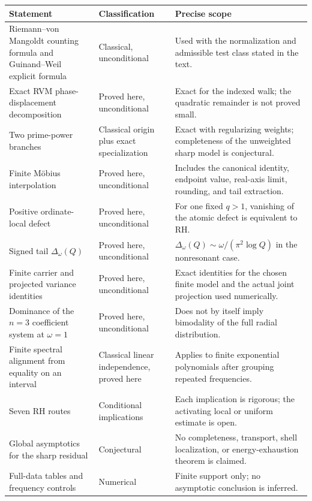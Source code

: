 \documentclass[11pt]{amsart}
\numberwithin{equation}{section}
\theoremstyle{plain}
\theoremstyle{definition}
\theoremstyle{remark}
\newcommand{\1}{\mathbf{1}}
\begin{document}
\begin{center}
\begin{tabular}{>{\raggedright\arraybackslash}p{}
                >{\raggedright\arraybackslash}p{}
                >{\raggedright\arraybackslash}p{}}
\toprule
Statement & Classification & Precise scope \\
\midrule
Riemann--von Mangoldt counting formula and Guinand--Weil explicit formula
& Classical, unconditional
& Used with the normalization and admissible test class stated in the text. \\
Exact RVM phase-displacement decomposition
& Proved here, unconditional
& Exact for the indexed walk; the quadratic remainder is not proved small. \\
Two prime-power branches
& Classical origin plus exact specialization
& Exact with regularizing weights; completeness of the unweighted sharp model is conjectural. \\
Finite Möbius interpolation
& Proved here, unconditional
& Includes the canonical identity, endpoint value, real-axis limit, rounding, and tail extraction. \\
Positive ordinate-local defect
& Proved here, unconditional
& For one fixed \(q>1\), vanishing of the atomic defect is equivalent to RH. \\
Signed tail \(\Delta_\omega(Q)\)
& Proved here, unconditional
& \(\Delta_\omega(Q)\sim\omega/(\pi^2\log Q)\) in the nonresonant case. \\
Finite carrier and projected variance identities
& Proved here, unconditional
& Exact identities for the chosen finite model and the actual joint projection used numerically. \\
Dominance of the \(n=3\) coefficient system at \(\omega=1\)
& Proved here, unconditional
& Does not by itself imply bimodality of the full radial distribution. \\
Finite spectral alignment from equality on an interval
& Classical linear independence, proved here
& Applies to finite exponential polynomials after grouping repeated frequencies. \\
Seven RH routes
& Conditional implications
& Each implication is rigorous; the activating local or uniform estimate is open. \\
Global asymptotics for the sharp residual
& Conjectural
& No completeness, transport, shell localization, or energy-exhaustion theorem is claimed. \\
Full-data tables and frequency controls
& Numerical
& Finite support only; no asymptotic conclusion is inferred. \\
\bottomrule
\end{tabular}
\end{center}
\end{document}
